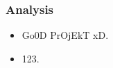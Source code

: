 \begin{frame}
  \frametitle{Analysis}
	\begin{itemize}
		\item Go0D PrOjEkT xD.
		\item 123.
	\end{itemize}
\end{frame}
